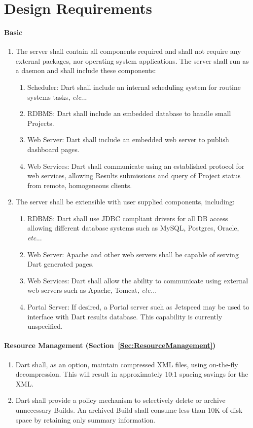 \documentclass{InsightBook}
\makeatletter
\DeclareRobustCommand\onedot{\futurelet\@let@token\@onedot}
\def\@onedot{\ifx\@let@token.\else.\xspace\fi}
\def\etc{\emph{etc}\onedot}
\makeatother
\begin{document}
\section{Design Requirements}
\paragraph{Basic}
\begin{enumerate}
\item The server shall contain all components required and shall not
require any external packages, nor operating system applications.
The server shall run as a daemon and shall include these components:
        \begin{enumerate}
        \item Scheduler: Dart shall include an internal scheduling
system for routine systems tasks, \etc.
        \item RDBMS: Dart shall include an embedded database to
handle small Projects.
        \item Web Server: Dart shall include an embedded web server
to publish dashboard pages.
        \item Web Services: Dart shall communicate using an
established protocol for web services, allowing Results submissions
and query of Project status from remote, homogeneous clients.
        \end{enumerate}
\item The server shall be extensible with user supplied components,
including:
        \begin{enumerate}
        \item RDBMS: Dart shall use JDBC compliant drivers for all DB
access allowing different database systems such as MySQL, Postgres,
Oracle, \etc.
        \item Web Server: Apache and other web servers shall be
capable of serving Dart generated pages.
        \item Web Services: Dart shall allow the ability to
communicate using external web servers such as Apache, Tomcat,
\etc.
        \item Portal Server: If desired, a Portal server such as
Jetspeed may be used to interface with Dart results database.  This
capability is currently unspecified.
        \end{enumerate}
\end{enumerate}
\paragraph{Resource Management (Section~\ref{Sec:ResourceManagement})}
\begin{enumerate}
\item Dart shall, as an option, maintain compressed XML files, using
on-the-fly decompression.  This will result in approximately 10:1
spacing savings for the XML. 
\item Dart shall provide a policy mechanism to selectively delete
or archive unnecessary Builds.  An archived Build shall consume less
than 10K of disk space by retaining only summary information.
\end{enumerate}
\end{document}

